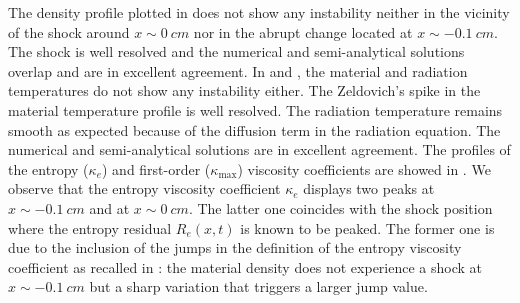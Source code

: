 \documentclass[times,doublespace]{fldauth}%
\begin{document}
%
The density profile plotted in  does not show any instability neither in the vicinity of the shock around $x \sim 0 \ cm$ nor in the abrupt change located at $x \sim -0.1 \ cm$. The shock is well resolved and the numerical and semi-analytical solutions overlap and are in excellent agreement.
In  and , the material and radiation temperatures do not show any instability either. The Zeldovich's spike in the material temperature profile is well resolved. The radiation temperature remains smooth as expected because of the diffusion term in the radiation equation. The numerical and semi-analytical solutions are in excellent agreement. 
The profiles of the entropy ($\kappa_e$) and first-order ($\kappa_\text{max}$) viscosity coefficients are showed in . We observe that the entropy viscosity coefficient $\kappa_e$ displays two peaks at $x\sim-0.1 \ cm$ and at $x \sim 0 \ cm$. The latter one coincides with the shock position where the entropy residual $R_e(x,t)$ is known to be peaked. %
The former one is due to the inclusion of the jumps in the definition of the entropy viscosity coefficient as recalled in : the material density does not experience a shock at $x\sim-0.1 \ cm$ but a sharp variation that triggers a larger jump value. 
\end{document}
